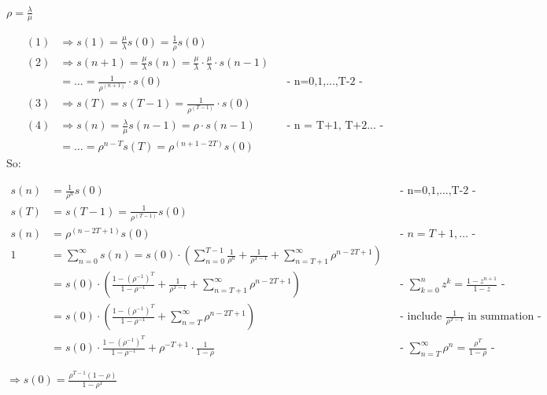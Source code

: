 $\rho =\frac{\lambda }{\mu }$

\begin{align*}
\left(1\right)&\Rightarrow s\left(1\right)=\frac{\mu }{\lambda }s\left(0\right)=\frac{1}{\rho }s\left(0\right)\\
\left(2\right)&\Rightarrow s\left(n+1\right)=\frac{\mu }{\lambda }s\left(n\right)=\frac{\mu }{\lambda }\cdot \frac{\mu }{\lambda }\cdot s\left(n-1\right)\\
&=\ldots=\frac{1}{\rho ^{\left(n+1\right)}}\cdot s\left(0\right)&& \text{- n=0,1,...,T-2 -}\\
\left(3\right)&\Rightarrow s\left(T\right)=s\left(T-1\right)=\frac{1}{\rho ^{\left(T-1\right)}}\cdot s\left(0\right)\\
\left(4\right)&\Rightarrow s\left(n\right)=\frac{\lambda }{\mu }s\left(n-1\right)=\rho \cdot s\left(n-1\right) && \text{- n = T+1, T+2... -}\\
&=\ldots=\rho ^{n-T}s\left(T\right)=\rho ^{\left(n+1-2T\right)}s\left(0\right)
\end{align*}
So:

\begin{align*}
s\left(n\right)&=\frac{1}{\rho ^{n}}s\left(0\right)&& \text{- n=0,1,...,T-2 -}\\
s\left(T\right)&=s\left(T-1\right)=\frac{1}{\rho ^{\left(T-1\right)}}s\left(0\right)\\
s\left(n\right)&=\rho ^{\left(n-2T+1\right)}s\left(0\right)&& \text{-  $n=T+1,\ldots$ -}\\
1&=\sum_{{n=0}}^{\infty}s\left(n\right)=s\left(0\right)\cdot \left(\sum _{{n=0}}^{{T-1}}\frac{1}{\rho ^{n}}+\frac{1}{\rho ^{{T-1}}}+\sum _{{n=T+1}}^{\infty}\rho ^{{n-2T+1}}\right)\\
&=s\left(0\right)\cdot \left(\frac{1-\left(\rho ^{{-1}}\right)^{T}}{1-\rho ^{{-1}}}+\frac{1}{\rho ^{{T-1}}}+\sum _{{n=T+1}}^{\infty}\rho ^{{n-2T+1}}\right) && \text{- $\sum_{k=0}^{n} z^k = \frac{1 - z^{n+1}}{1-z}$ -}\\
&=s\left(0\right)\cdot \left(\frac{1-\left(\rho ^{{-1}}\right)^{T}}{1-\rho ^{{-1}}}+\sum _{{n=T}}^{\infty}\rho ^{{n-2T+1}}\right) && \text{- include $\frac{1}{\rho ^{{T-1}}}$ in summation -}\\
&= s\left(0\right)\cdot \frac{1-\left(\rho ^{-1}\right)^T}{1-\rho ^{-1}} + \rho ^{{-T+1}}\cdot \frac{1}{1-\rho } && \text{- $\sum _{{n=T}}^{\infty} \rho ^{n}=\frac{\rho ^{T}}{1-\rho }$ -}
\end{align*}

$\Rightarrow s\left(0\right)=\frac{\rho ^{{T-1}}\left(1-\rho \right)}{1-\rho ^{T}}$

